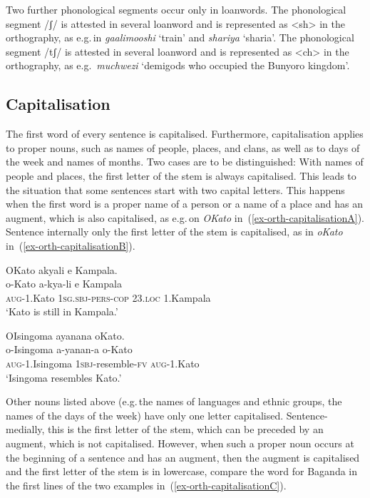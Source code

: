 Two further phonological segments occur only in loanwords. 
The phonological segment /ʃ/ is attested in several loanword and is represented as <sh> in the orthography, as e.g.\,in  \textit{gaalimooshi} `train' and  \textit{shariya} `sharia'. 
The phonological segment /tʃ/  is attested in several loanword and is represented as <ch> in the orthography, as e.g.\, \textit{muchwezi} `demigods who occupied the Bunyoro kingdom'.

\subsection{Capitalisation}\label{sec-orthogrpaphy-capitalisation}
The first word of every sentence is capitalised. 
Furthermore, capitalisation applies to proper nouns, such as names of people, places, and clans, as well as to days of the week and names of months.
Two cases are to be distinguished: 
With names of people and places, the first letter of the stem is always capitalised. 
This leads to the situation that some sentences start with two capital letters. 
This happens when the first word is a proper name of a person or a name of a place and has an augment, which is also capitalised, as e.g.\,on  \textit{OKato} in~(\ref{ex-orth-capitalisationA}). Sentence internally only the first letter of the stem is capitalised, as in  \textit{oKato} in~(\ref{ex-orth-capitalisationB}).

\ea 
\begin{xlist}
\ex \label{ex-orth-capitalisationA}
	\glll OKato akyali e Kampala.\\
	  o-Kato a-kya-li e Kampala\\
		\textsc{aug}-1.Kato \textsc{1sg.sbj}-\textsc{pers}-\textsc{cop} 23.\textsc{loc} 1.Kampala\\
\glt ‘Kato is still in Kampala.’

\ex \label{ex-orth-capitalisationB}
	\glll  OIsingoma ayanana oKato.\\
	o-Isingoma a-yanan-a o-Kato\\
		\textsc{aug}-1.Isingoma \textsc{1sbj}-resemble-\textsc{fv} \textsc{aug}-1.Kato\\
\glt ‘Isingoma resembles Kato.’ 
\end{xlist}
\z

Other nouns listed above (e.g.\,the names of languages and ethnic groups, the names of the days of the week) have only one letter capitalised. 
Sentence-medially, this is the first letter of the stem, which can be preceded by an augment, which is not capitalised. 
However, when such a proper noun occurs at the beginning of a sentence and has an augment, then the augment is capitalised and the first letter of the stem is in lowercase, compare the word for Baganda in the first lines of the two examples in~(\ref{ex-orth-capitalisationC}).

